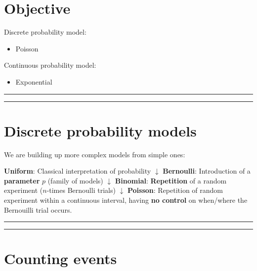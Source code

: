 \documentclass[
]{book}
\providecommand{\tightlist}{%
  \setlength{\itemsep}{0pt}\setlength{\parskip}{0pt}}
\begin{document}
\hypertarget{objective-6}{%
\section{Objective}\label{objective-6}}

Discrete probability model:

\begin{itemize}
\tightlist
\item
  Poisson
\end{itemize}

Continuous probability model:

\begin{itemize}
\tightlist
\item
  Exponential
\end{itemize}

\begin{center}\rule{0.5\linewidth}{0.5pt}\end{center}

\begin{center}\rule{0.5\linewidth}{0.5pt}\end{center}

\hypertarget{discrete-probability-models-1}{%
\section{Discrete probability models}\label{discrete-probability-models-1}}

We are building up more complex models from simple ones:

\textbf{Uniform}: Classical interpretation of probability
\(\downarrow\)
\textbf{Bernoulli}: Introduction of a \textbf{parameter} \(p\) (family of models)
\(\downarrow\)
\textbf{Binomial}: \textbf{Repetition} of a random experiment (\(n\)-times Bernoulli trials)
\(\downarrow\)
\textbf{Poisson}: Repetition of random experiment within a continuous interval, having \textbf{no control} on when/where the Bernouilli trial occurs.

\begin{center}\rule{0.5\linewidth}{0.5pt}\end{center}

\begin{center}\rule{0.5\linewidth}{0.5pt}\end{center}

\hypertarget{counting-events}{%
\section{Counting events}\label{counting-events}}
\end{document}

